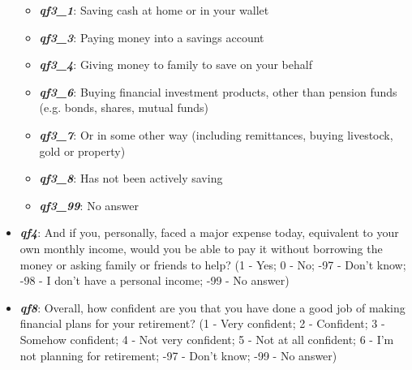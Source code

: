 \documentclass[a4paper,11pt]{article}
\begin{document}
\begin{itemize}
    \begin{itemize}
        \item \textit{\textbf{qf3\_1}}: Saving cash at home or in your wallet 
        \item \textit{\textbf{qf3\_3}}: Paying money into a savings account
        \item \textit{\textbf{qf3\_4}}: Giving money to family to save on your behalf
        \item \textit{\textbf{qf3\_6}}: Buying financial investment products, other than pension funds (e.g. bonds, shares, mutual funds)
        \item \textit{\textbf{qf3\_7}}: Or in some other way (including remittances, buying livestock, gold or property)
        \item \textit{\textbf{qf3\_8}}: Has not been actively saving
        \item \textit{\textbf{qf3\_99}}: No answer 
    \end{itemize}
    \item \textit{\textbf{qf4}}: And if you, personally, faced a major expense today, equivalent to your own monthly income, would you be able to pay it without borrowing the money or asking family or friends to help? (1 - Yes; 0 - No; -97 - Don't know; -98 - I don't have a personal income; -99 - No answer)
    \item \textit{\textbf{qf8}}: Overall, how confident are you that you have done a good job of making financial plans for your retirement? 
    (1 - Very confident; 2 - Confident; 3 - Somehow confident; 4 - Not very confident; 5 - Not at all confident; 6 - I’m not planning for retirement; -97 - Don't know; -99 - No answer)
    

\end{itemize}
\end{document}
